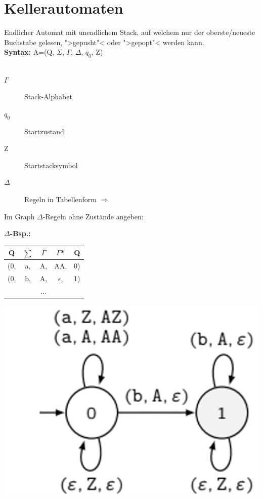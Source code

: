 \documentclass[12pt,a4paper]{article}
\begin{document}
\section{Kellerautomaten}
	Endlicher Automat mit unendlichem Stack, auf welchem nur der oberste/neueste Buchstabe gelesen, ">gepusht"< oder ">gepopt"< werden kann.\\
	\textbf{Syntax:} A=(Q, $\Sigma$, $\Gamma$, $\Delta$, $q_0$, Z)\\\\
	\begin{minipage}[c]{0.5\textwidth}
		\begin{description}
			\item[$\Gamma$] Stack-Alphabet
			\item[$q_0$] Startzustand
			\item[Z] Startstacksymbol  
			\item[$\Delta$] Regeln in Tabellenform $\Rightarrow$
		\end{description}
		Im Graph $\Delta$-Regeln ohne Zustände angeben:
	\end{minipage}
	\begin{minipage}[c]{0.5\textwidth}
		$\Delta$\textbf{-Bsp.:}\\
		\begin{tabular}[h]{c|c|c|c|c}
			Q & $\sum$ & $\Gamma$ & $\Gamma$* & Q\\
			\hline
			(0, & a, & A, & AA, & 0)\\
			(0, & b, & A, & $\epsilon$, & 1)\\
			&&...
		\end{tabular}
		\includegraphics[scale=0.3]{Bilder/KellerAutomat.png}
	\end{minipage}
\end{document}
